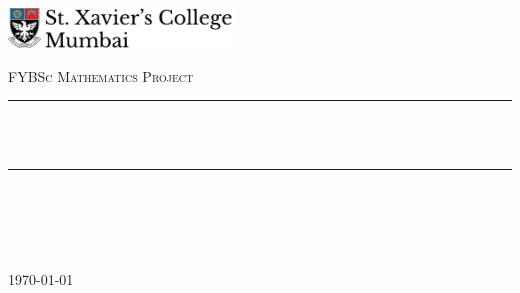 \begin{titlepage}

\newcommand{\HRule}{\rule{\linewidth}{0.5mm}} %



\includegraphics[width = 6cm]{./figures/stxaviers}\vspace{2cm} 
\center %

\begin{center}
    

\textsc{\Large FYBSc Mathematics Project}\vspace{0.5cm} 


\HRule \\[0.4cm]
{ \huge \bfseries \reporttitle}\\[0.4cm] %
\HRule \\[2.5cm]
\end{center}

\begin{minipage}{0.4\textwidth}
\begin{center}
\reportauthor %
\end{center}
\end{minipage}
~
\begin{minipage}{0.4\textwidth}
\begin{center}
\UID %
\end{center}
\end{minipage}\\[4cm]


\vfill %
\today
\end{titlepage}
